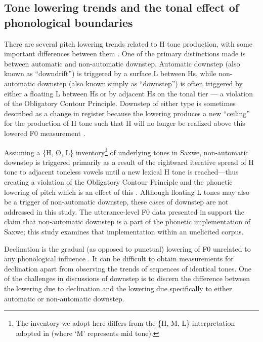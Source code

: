 \documentclass[
  11pt,
  b5paper,
]{article}
\begin{document}
\hypertarget{tone-lowering-trends-and-the-tonal-effect-of-phonological-boundaries}{%
\subsection{Tone lowering trends and the tonal effect of phonological
boundaries}\label{tone-lowering-trends-and-the-tonal-effect-of-phonological-boundaries}}

There are several pitch lowering trends related to H tone production,
with some important differences between them
\autocite{connell_downstep_2011,Downing2017Introduction,Gussenhoven2004phonology}.
One of the primary distinctions made is between automatic and
non-automatic downstep. Automatic downstep (also known as ``downdrift'')
is triggered by a surface L between Hs, while non-automatic downstep
(also known simply as ``downstep'') is often triggered by either a
floating L between Hs or by adjacent Hs on the tonal tier --- a
violation of the Obligatory Contour Principle. Downstep of either type
is sometimes described as a change in register because the lowering
produces a new ``ceiling'' for the production of H tone such that H will
no longer be realized above this lowered F0 measurement
\autocite{Clements1979description,connell_downstep_2011}.

Assuming a \{H, Ø, L\} inventory\footnote{The inventory we adopt here
  differs from the \{H, M, L\} interpretation adopted in
  \textcite{Beavon-Ham2019Tone} (where `M' represents mid tone).} of
underlying tones in Saxwe, non-automatic downstep is triggered primarily
as a result of the rightward iterative spread of H tone to adjacent
toneless vowels until a new lexical H tone is reached---thus creating a
violation of the Obligatory Contour Principle and the phonetic lowering
of pitch which is an effect of this \autocite[241--245,
264--282]{Beavon-Ham2019Tone}. Although floating L tones may also be a
trigger of non-automatic downstep, these cases of downstep are not
addressed in this study. The utterance-level F0 data presented in
\textcite{Beavon-Ham2019Tone} support the claim that non-automatic
downstep is a part of the phonetic implementation of Saxwe; this study
examines that implementation within an unelicited corpus.

Declination is the gradual (as opposed to punctual) lowering of F0
unrelated to any phonological influence
\autocite{connell_downstep_2011,Downing2017Introduction}. It can be
difficult to obtain measurements for declination apart from observing
the trends of sequences of identical tones. One of the challenges in
discussions of downstep is to discern the difference between the
lowering due to declination and the lowering due specifically to either
automatic or non-automatic downstep.
\end{document}
